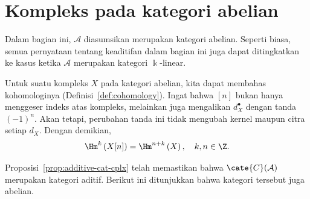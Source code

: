 
\section{Kompleks pada kategori abelian}\label{sec:Abel-cplx}
\hypertarget{o014.aljabr2.chapter3.abelian-category-complexes}{ }

Dalam bagian ini, $\mathcal{A}$ diasumsikan merupakan kategori abelian. Seperti
biasa, semua pernyataan tentang keaditifan dalam bagian ini juga dapat
ditingkatkan ke kasus ketika $\mathcal{A}$ merupakan kategori $\Bbbk$-linear.

Untuk suatu kompleks $X$ pada kategori abelian, kita dapat membahas
kohomologinya (Definisi~\ref{def:cohomology}). Ingat bahwa $[n]$ bukan hanya
menggeser indeks atas kompleks, melainkan juga mengalikan $d_X^\bullet$ dengan
tanda $(-1)^n$. Akan tetapi, perubahan tanda ini tidak mengubah kernel maupun
citra setiap $d_X$. Dengan demikian,
\[ \Hm^k\left( X[n] \right) = \Hm^{n+k} \left(X \right), \quad k, n \in \Z . \]

Proposisi~\ref{prop:additive-cat-cplx} telah memastikan bahwa
$\cate{C}(\mathcal{A})$ merupakan kategori aditif. Berikut ini ditunjukkan bahwa
kategori tersebut juga abelian.

